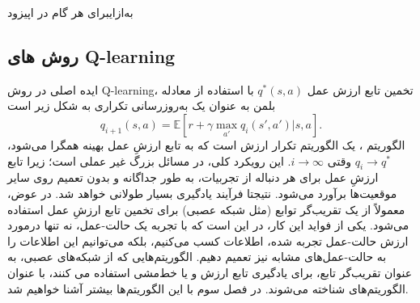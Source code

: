 \‌به‌ازای{برای هر گام در اپیزود}
\subsection{روش های Q-learning}
ایده اصلی در روش 
Q-learning،
 تخمین تابع ارزش عمل  
$q^*(s,a)$ 
با استفاده از معادله بلمن به عنوان یک به‌روزرسانی تکراری به شکل زیر است
\cite{mnih2013playing}
$$q_{i+1}(s,a) = \mathbb{E}[r+ \gamma \max_{a'} q_i(s',a')|s,a].$$
الگوریتم 
،
یک الگوریتم تکرار ارزش است که به تابع ارزشِ عمل بهینه همگرا می‌شود، 
$q_i \longrightarrow q^*$
وقتی
$i \longrightarrow \infty$.
این رویکرد کلی، در مسائل بزرگ غیر عملی است؛
زیرا تابع ارزشِ عمل برای هر دنباله از تجربیات،  به طور جداگانه و بدون تعمیم روی سایر موقعیت‌ها برآورد می‌شود. نتیجتا فرآیند یادگیری بسیار طولانی خواهد شد. در عوض، معمولاً از یک تقریب‌گر توابع (مثل شبکه عصبی) برای تخمین تابع ارزشِ عمل استفاده می‌شود.  یکی از فواید این کار، در این است که با تجربه یک حالت-عمل، نه تنها درمورد ارزش حالت-عمل تجربه شده، اطلاعات کسب می‌کنیم، بلکه می‌توانیم این اطلاعات را به حالت-عمل‌های مشابه نیز تعمیم دهیم.
الگوریتم‌هایی که از شبکه‌های عصبی، به عنوان تقریب‌گر تابع، برای یادگیری تابع ارزش و یا خط‌مشی استفاده می کنند، با عنوان الگوریتم‌های 
\textit{}
شناخته می‌شوند. در فصل سوم با این الگوریتم‌ها بیشتر آشنا خواهیم شد.